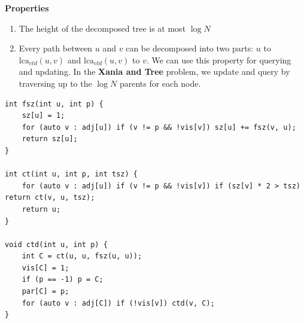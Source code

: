 \documentclass[12pt,a4paper]{article}
\begin{document}
\noindent\textbf{Properties}
\begin{enumerate}
    \item The height of the decomposed tree is at most $\log{N}$
    \item Every path between $u$ and $v$ can be decomposed into two parts: $u$ to $\text{lca}_{ctd}(u, v)$ and $\text{lca}_{ctd}(u, v)$ to $v$. We can use this property for querying and updating. In the \textbf{Xania and Tree} problem, we update and query by traversing up to the $\log{N}$ parents for each node.
\end{enumerate}

\begin{lstlisting}
int fsz(int u, int p) {
    sz[u] = 1;
    for (auto v : adj[u]) if (v != p && !vis[v]) sz[u] += fsz(v, u);
    return sz[u];
}
 
int ct(int u, int p, int tsz) {
    for (auto v : adj[u]) if (v != p && !vis[v]) if (sz[v] * 2 > tsz) return ct(v, u, tsz);
    return u;
}
 
void ctd(int u, int p) {
    int C = ct(u, u, fsz(u, u));
    vis[C] = 1;
    if (p == -1) p = C;
    par[C] = p;
    for (auto v : adj[C]) if (!vis[v]) ctd(v, C);
}
\end{lstlisting}
\end{document}
